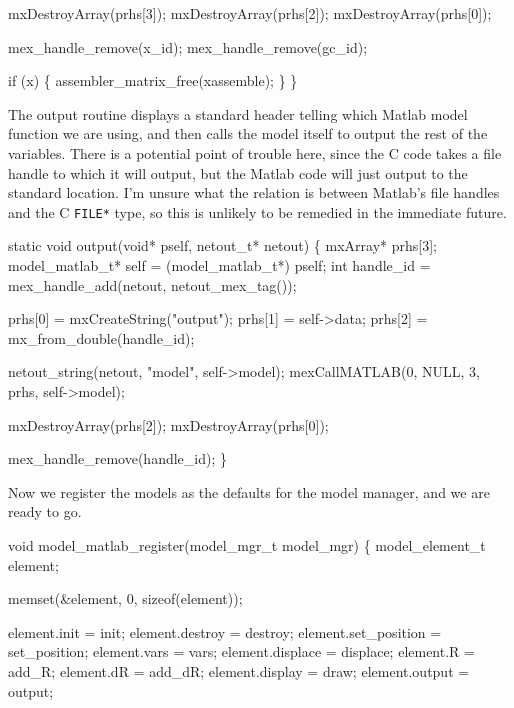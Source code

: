     mxDestroyArray(prhs[3]);
    mxDestroyArray(prhs[2]);
    mxDestroyArray(prhs[0]);

    mex_handle_remove(x_id);
    mex_handle_remove(gc_id);

    if (x) \{
        assembler_matrix_free(xassemble);
    \}
\}

\nwendcode{}\nwdocspar

The output routine displays a standard header telling which Matlab
model function we are using, and then calls the model itself
to output the rest of the variables.  There is a potential point
of trouble here, since the C code takes a file handle to which it
will output, but the Matlab code will just output to the standard
location.  I'm unsure what the relation is between Matlab's file
handles and the C {\tt{}FILE*} type, so this is unlikely to be
remedied in the immediate future.

\nwenddocs{}\plusendmoddef
static void output(void* pself, netout_t* netout)
\{
    mxArray* prhs[3];
    model_matlab_t* self = (model_matlab_t*) pself;
    int handle_id = mex_handle_add(netout, netout_mex_tag());

    prhs[0] = mxCreateString("output");
    prhs[1] = self->data;
    prhs[2] = mx_from_double(handle_id);

    netout_string(netout, "model", self->model);
    mexCallMATLAB(0, NULL, 3, prhs, self->model); 

    mxDestroyArray(prhs[2]);
    mxDestroyArray(prhs[0]);

    mex_handle_remove(handle_id);
\}

\nwendcode{}\nwdocspar

Now we register the models as the defaults for the model manager,
and we are ready to go.

\nwenddocs{}\endmoddef
void model_matlab_register(model_mgr_t model_mgr)
\{
    model_element_t  element;

    memset(&element,  0, sizeof(element));

    element.init         = init;
    element.destroy      = destroy;
    element.set_position = set_position;
    element.vars         = vars;
    element.displace     = displace;
    element.R            = add_R;
    element.dR           = add_dR;
    element.display      = draw;
    element.output       = output; 

